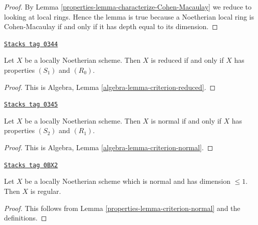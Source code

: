 \begin{proof}

By Lemma \ref{properties-lemma-characterize-Cohen-Macaulay}
we reduce to looking at local rings.
Hence the lemma is true because a Noetherian local ring is Cohen-Macaulay
if and only if it has depth equal to its dimension.
\end{proof}

\begin{lemma}
\label{properties-lemma-criterion-reduced}
\href{https://stacks.math.columbia.edu/tag/0344}{\texttt{Stacks tag 0344}}

Let $X$ be a locally Noetherian scheme.
Then $X$ is reduced if and only if $X$ has properties $(S_1)$ and $(R_0)$.
\end{lemma}

\begin{proof}
This is Algebra, Lemma \ref{algebra-lemma-criterion-reduced}.
\end{proof}

\begin{lemma}
\label{properties-lemma-criterion-normal}
\href{https://stacks.math.columbia.edu/tag/0345}{\texttt{Stacks tag 0345}}

Let $X$ be a locally Noetherian scheme.
Then $X$ is normal if and only if $X$ has properties $(S_2)$ and $(R_1)$.
\end{lemma}

\begin{proof}
This is Algebra, Lemma \ref{algebra-lemma-criterion-normal}.
\end{proof}

\begin{lemma}
\label{properties-lemma-normal-dimension-1-regular}
\href{https://stacks.math.columbia.edu/tag/0BX2}{\texttt{Stacks tag 0BX2}}

Let $X$ be a locally Noetherian scheme which is normal and
has dimension $\leq 1$. Then $X$ is regular.
\end{lemma}

\begin{proof}

This follows from Lemma \ref{properties-lemma-criterion-normal} and the definitions.
\end{proof}

